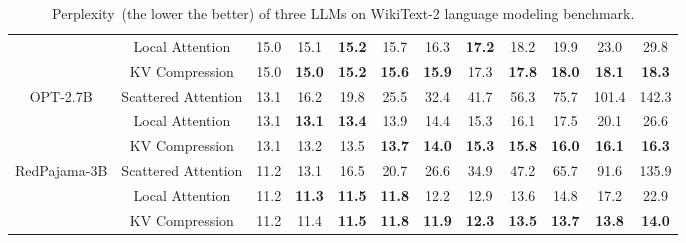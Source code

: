 \begin{table}[th]
\begin{tabular}{c|c|cccccccccc}
                              & Local Attention    &15.0   &15.1  & \textbf{15.2}                    & 15.7                    & 16.3                    & \textbf{17.2}                    & 18.2                    & 19.9                    & 23.0                    & 29.8                    \\
                              & KV Compression      &15.0  &\textbf{15.0}  & \textbf{15.2}                    & \textbf{15.6}                    & \textbf{15.9}                    & 17.3                    & \textbf{17.8}                    & \textbf{18.0}                    & \textbf{18.1}                    & \textbf{18.3}                    \\
 \midrule
  \multirow{3}{*}{OPT-2.7B}     & Scattered Attention    &13.1 &16.2  & 19.8                    & 25.5                    & 32.4                    & 41.7                    & 56.3                    & 75.7                    & 101.4                   & 142.3                   \\
                              & Local Attention     &13.1   &\textbf{13.1} & \textbf{13.4}                    & 13.9                    & 14.4                    & 15.3                    & 16.1                    & 17.5                    & 20.1                    & 26.6                    \\
                              & KV Compression       &13.1 &13.2  & 13.5                    & \textbf{13.7}                    & \textbf{14.0}                    & \textbf{15.3}                    & \textbf{15.8}                    & \textbf{16.0}                    & \textbf{16.1}                    & \textbf{16.3}                    \\
 \midrule
  \multirow{3}{*}{RedPajama-3B} & Scattered Attention  &11.2 &13.1  & 16.5                    & 20.7                    & 26.6                    & 34.9                    & 47.2                    & 65.7                    & 91.6                    & 135.9                   \\
                              & Local Attention      &11.2  &\textbf{11.3} & \textbf{11.5}                    & \textbf{11.8}                    & 12.2                    & 12.9                    & 13.6                    & 14.8                    & 17.2                    & 22.9                    \\
                              & KV Compression      &11.2  &11.4  & \textbf{11.5}                    & \textbf{11.8}                   & \textbf{11.9}                    & \textbf{12.3}                    & \textbf{13.5}                    & \textbf{13.7}                    & \textbf{13.8}                    & \textbf{14.0}               \\    
\bottomrule
\end{tabular}
\caption{Perplexity~(the lower the better) of three LLMs on WikiText-2 language modeling benchmark.
}
\label{table:main}
\end{table}
